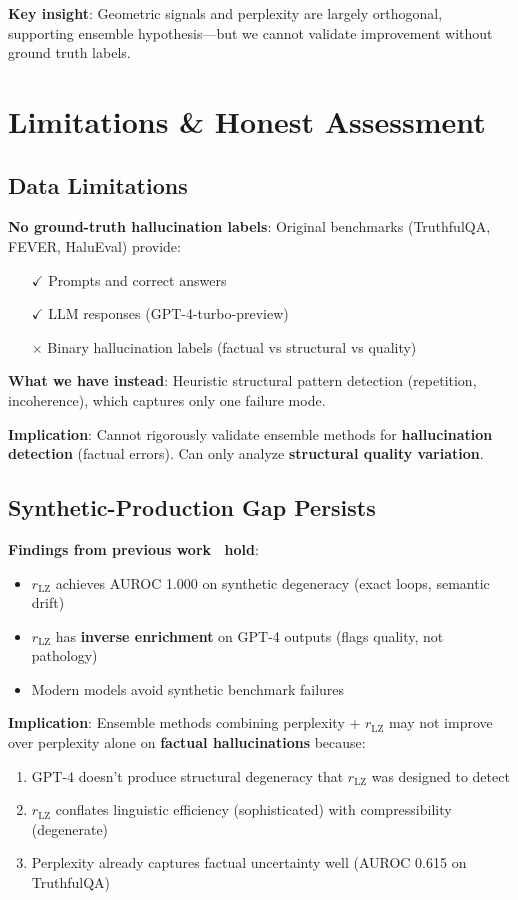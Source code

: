 \documentclass[11pt]{article}
\begin{document}
\textbf{Key insight}: Geometric signals and perplexity are largely orthogonal, supporting ensemble hypothesis---but we cannot validate improvement without ground truth labels.

\section{Limitations \& Honest Assessment}
\label{sec:limitations}

\subsection{Data Limitations}

\textbf{No ground-truth hallucination labels}: Original benchmarks (TruthfulQA, FEVER, HaluEval) provide:
\begin{itemize}
\item[$\checkmark$] Prompts and correct answers
\item[$\checkmark$] LLM responses (GPT-4-turbo-preview)
\item[$\times$] Binary hallucination labels (factual vs structural vs quality)
\end{itemize}

\textbf{What we have instead}: Heuristic structural pattern detection (repetition, incoherence), which captures only one failure mode.

\textbf{Implication}: Cannot rigorously validate ensemble methods for \textbf{hallucination detection} (factual errors). Can only analyze \textbf{structural quality variation}.

\subsection{Synthetic-Production Gap Persists}

\textbf{Findings from previous work~\cite{khokhla2025synthetic} hold}:
\begin{itemize}
\item $r_{\text{LZ}}$ achieves AUROC 1.000 on synthetic degeneracy (exact loops, semantic drift)
\item $r_{\text{LZ}}$ has \textbf{inverse enrichment} on GPT-4 outputs (flags quality, not pathology)
\item Modern models avoid synthetic benchmark failures
\end{itemize}

\textbf{Implication}: Ensemble methods combining perplexity + $r_{\text{LZ}}$ may not improve over perplexity alone on \textbf{factual hallucinations} because:
\begin{enumerate}
\item GPT-4 doesn't produce structural degeneracy that $r_{\text{LZ}}$ was designed to detect
\item $r_{\text{LZ}}$ conflates linguistic efficiency (sophisticated) with compressibility (degenerate)
\item Perplexity already captures factual uncertainty well (AUROC 0.615 on TruthfulQA)
\end{enumerate}
\end{document}
